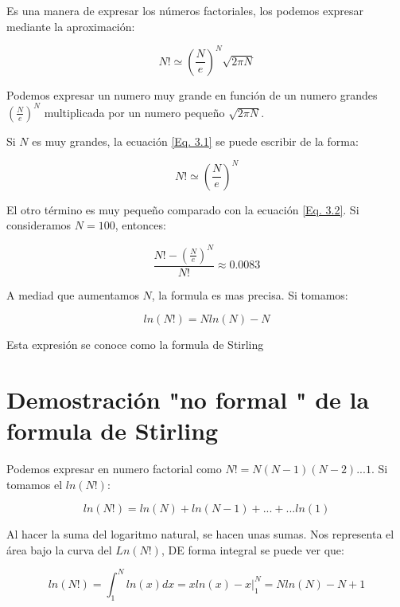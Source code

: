 \documentclass[11pt,fleqn]{book}
\begin{document}
\begin{definition}
Es una manera de expresar los números factoriales, los podemos expresar mediante la aproximación:

\begin{equation}
    N!\simeq\left(\frac{N}{e}\right)^{N}\sqrt{2\pi N}
    \label{Eq. 3.1}
\end{equation}

Podemos expresar un numero muy grande en función de un numero grandes $(\frac{N}{e})^{N}$ multiplicada por un numero pequeño $\sqrt{2\pi N}$.

Si $N$ es muy grandes, la ecuación \ref{Eq. 3.1} se puede escribir de la forma:

\begin{equation}
    N!\simeq\left(\frac{N}{e}\right)^{N}
    \label{Eq. 3.2}
\end{equation}

El otro término es muy pequeño comparado con la ecuación \ref{Eq. 3.2}. Si consideramos $N=100$, entonces:

\begin{equation*}
    \frac{N!-\left(\frac{N}{e}\right)^{N}}{N!}\approx0.0083
\end{equation*}

A mediad que aumentamos $N$, la formula es mas precisa. Si tomamos:

\begin{equation}
    ln(N!)=Nln(N)-N
    \label{Eq. 3.3}
\end{equation}

Esta expresión se conoce como la formula de Stirling
\end{definition}

\section{Demostración "no formal " de la formula de Stirling}

Podemos expresar en numero factorial como $N!=N(N-1)(N-2)...1$. Si tomamos el $ln(N!)$:

\begin{equation*}
    ln(N!)=ln(N)+ln(N-1)+...+...ln(1)
\end{equation*}

Al hacer la suma del logaritmo natural, se hacen unas sumas. Nos representa el área bajo la curva del $Ln(N!)$, DE forma integral se puede ver que:


\begin{equation*}
    ln(N!)=\int_{1}^{N}ln(x)dx=xln(x)-x|_{1}^{N}=Nln(N)-N+1
\end{equation*}
\end{document}
